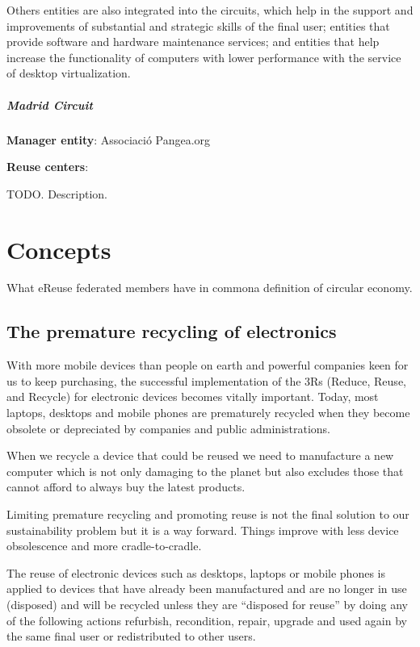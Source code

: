 \documentclass[
]{book}
\begin{document}
Others entities are also integrated into the circuits, which help in the support and improvements of substantial and strategic skills of the final user; entities that provide software and hardware maintenance services; and entities that help increase the functionality of computers with lower performance with the service of desktop virtualization.

\hypertarget{madrid-circuit}{%
\paragraph{Madrid Circuit}\label{madrid-circuit}}

\textbf{Manager entity}: Associació Pangea.org

\textbf{Reuse centers}:

TODO. Description.

\hypertarget{concepts}{%
\chapter{Concepts}\label{concepts}}

What eReuse federated members have in commona definition of circular economy.

\hypertarget{the-premature-recycling-of-electronics}{%
\section{The premature recycling of electronics}\label{the-premature-recycling-of-electronics}}

With more mobile devices than people on earth and powerful companies keen for us to keep purchasing, the successful implementation of the 3Rs (Reduce, Reuse, and Recycle) for electronic devices becomes vitally important. Today, most laptops, desktops and mobile phones are prematurely recycled when they become obsolete or depreciated by companies and public administrations.

When we recycle a device that could be reused we need to manufacture a new computer which is not only damaging to the planet but also excludes those that cannot afford to always buy the latest products.

Limiting premature recycling and promoting reuse is not the final solution to our sustainability problem but it is a way forward. Things improve with less device obsolescence and more cradle-to-cradle.

The reuse of electronic devices such as desktops, laptops or mobile phones is applied to devices that have already been manufactured and are no longer in use (disposed) and will be recycled unless they are ``disposed for reuse'' by doing any of the following actions refurbish, recondition, repair, upgrade and used again by the same final user or redistributed to other users.
\end{document}
